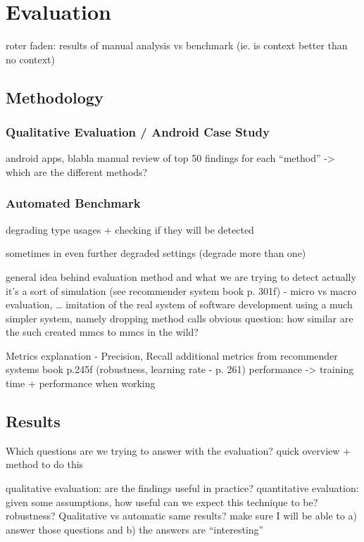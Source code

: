 \chapter{Evaluation}\label{ch:eval}
roter faden: results of manual analysis vs benchmark (ie. is context better than no context)


\section{Methodology}

\subsection{Qualitative Evaluation / Android Case Study}
android apps, blabla
manual review of top 50 findings for each ``method''
-> which are the different methods?

\subsection{Automated Benchmark}
degrading type usages + checking if they will be detected

sometimes in even further degraded settings (degrade more than one)

general idea behind evaluation method and what we are trying to detect
actually it's a sort of simulation (see recommender system book p. 301f) - micro vs macro evaluation, \ldots
    imitation of the real system of software development
    using a much simpler system, namely dropping method calls
    obvious question: how similar are the such created mmcs to mmcs in the wild?

Metrics explanation - Precision, Recall
    additional metrics from recommender systems book p.245f (robustness, learning rate - p. 261)
    performance -> training time + performance when working

\section{Results}
Which questions are we trying to answer with the evaluation?
quick overview + method to do this

qualitative evaluation: are the findings useful in practice?
quantitative evaluation: given some assumptions, how useful can we expect this technique to be? robustness? Qualitative vs automatic same results?
make sure I will be able to a) answer those questions and b) the answers are ``interesting''

